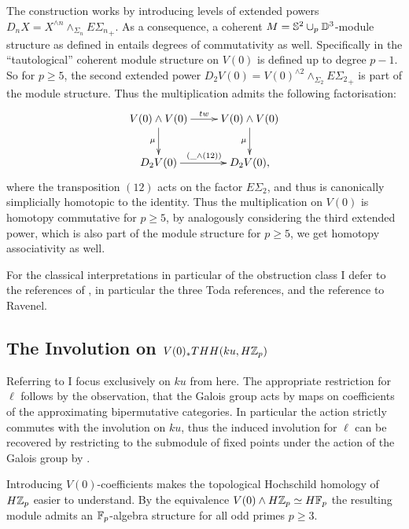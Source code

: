The construction \cite[Definition 2.1]{SchV0} 
works by introducing levels of extended powers 
$D_nX=X^{\wedge n}\wedge_{\Sigma_n} {E\Sigma_n}_+$. As a consequence, 
a coherent $M=\S^2\cup_p\mathbb{D}^3$-module structure as defined in 
\cite[Definition 2.1]{SchV0} entails degrees of commutativity as well. Specifically in 
\cite[Example 2.4]{SchV0} the ``tautological'' coherent module structure on 
$V(0)$ is defined up to degree $p-1$. So for $p\geq 5$, the second
extended power $D_2V(0)=V(0)^{\wedge 2}\wedge_{\Sigma_2}{E\Sigma_2}_+$ is part
of the module structure. Thus the multiplication admits the following factorisation:
\[\xymatrix{V(0)\wedge V(0)\ar[d]_\mu \ar[r]^{tw}& V(0)\wedge V(0)\ar[d]_\mu\\
D_2V(0)\ar[r]^{(\_\wedge (12))} & D_2V(0),}\]
where the transposition $(12)$ acts on the factor $E\Sigma_2$, and thus
is canonically simplicially homotopic to the identity. Thus the multiplication
on $V(0)$ is homotopy commutative for $p\geq 5$, by analogously considering
the third extended power, which is also part of the module structure for
$p\geq 5$, we get homotopy associativity as well.

For the classical interpretations in particular of the obstruction class I
defer to the references of \cite{SchV0}, in particular the three Toda 
references, and the reference to Ravenel.

\subsection{The Involution on $V(0)_*THH(ku,H\Z_p)$}
Referring to \cite[Proposition 10.1]{AuTHH} I focus exclusively on $ku$ from
here. The appropriate restriction for $\ell$ follows by the observation, that
the Galois group acts by maps on coefficients of the approximating 
bipermutative categories. In particular the action strictly commutes with
the involution on $ku$, thus the induced involution for $\ell$ can be
recovered by restricting to the submodule of fixed points under the action
of the Galois group by \cite[Proposition 10.1]{AuTHH}.

Introducing $V(0)$-coefficients makes the topological Hochschild homology
of $H\Z_p$ easier to understand. By the equivalence $V(0)\wedge H\Z_p\simeq 
H\F_p$ the resulting module admits an $\F_p$-algebra structure for all odd 
primes $p\geq 3$.
{}

